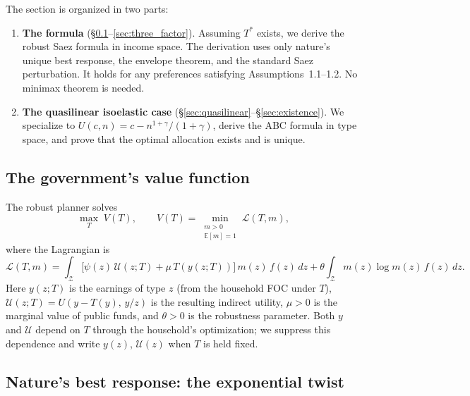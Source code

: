 \documentclass[12pt,a4paper]{article}
\theoremstyle{definition}
\theoremstyle{plain}
\theoremstyle{remark}
\newcommand{\E}{\mathbb{E}}
\newcommand{\calU}{\mathcal{U}}
\newcommand{\calZ}{\mathcal{Z}}
\newcommand{\calL}{\mathcal{L}}
\begin{document}
The section is organized in two parts:
\begin{enumerate}[label=\textbf{Part \Roman*.},leftmargin=3em]
\item \textbf{The formula}
  (\S\ref{sec:value_function}--\ref{sec:three_factor}).
  Assuming $T^*$ exists, we derive the robust Saez formula
  in income space.  The derivation uses only nature's
  unique best response, the envelope theorem, and the
  standard Saez perturbation.  It holds for any preferences
  satisfying Assumptions~1.1--1.2.  No minimax theorem
  is needed.
\item \textbf{The quasilinear isoelastic case}
  (\S\ref{sec:quasilinear}--\S\ref{sec:existence}).
  We specialize to $U(c,n) = c - n^{1+\gamma}/(1+\gamma)$,
  derive the ABC formula in type space, and prove that
  the optimal allocation exists and is unique.
\end{enumerate}


\subsection{The government's value function}
\label{sec:value_function}

The robust planner solves
\begin{equation}
\label{eq:maxmin}
  \max_{T} \; V(T),
  \qquad
  V(T) = \min_{\substack{m > 0 \\ \E[m] = 1}}
  \calL(T, m),
\end{equation}
where the Lagrangian is
\begin{equation}
\label{eq:L_def}
  \calL(T, m)
  = \int_\calZ \bigl[\psi(z)\,\calU(z; T)
    + \mu\,T(y(z; T))\bigr]\,m(z)\,f(z)\,dz
  + \theta \int_\calZ m(z)\log m(z)\,f(z)\,dz.
\end{equation}
Here $y(z; T)$ is the earnings of type $z$ (from the
household FOC under $T$), $\calU(z; T) = U(y - T(y),\,
y/z)$ is the resulting indirect utility,
$\mu > 0$ is the marginal value of public funds, and
$\theta > 0$ is the robustness parameter.  Both $y$ and
$\calU$ depend on $T$ through the household's
optimization; we suppress this dependence and write
$y(z)$, $\calU(z)$ when $T$ is held fixed.


\subsection{Nature's best response: the exponential twist}
\label{sec:natures_response}
\end{document}
